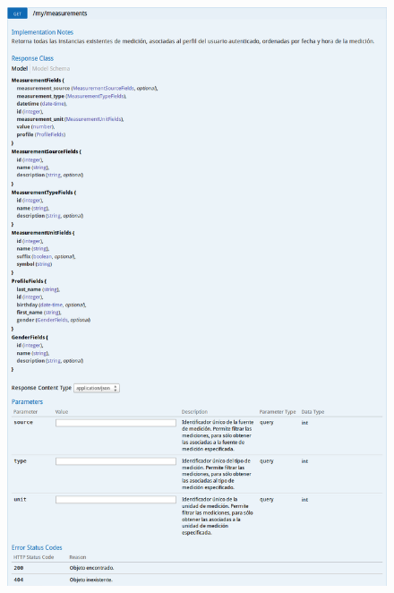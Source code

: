 \begin{figure}[h]
  \centering
  \includegraphics[width=\textwidth,height=.75\textheight,keepaspectratio]{img/especificacion_api/myMeasurementList_get}
  \label{myMeasurementList_get}
\end{figure}